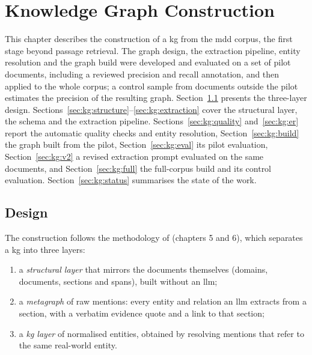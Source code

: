 
\chapter{Knowledge Graph Construction}\label{ch:kg}

This chapter describes the construction of a \gls{kg} from the \gls{mdd} corpus,
the first stage beyond passage retrieval. The graph design, the extraction pipeline,
entity resolution and the graph build were developed and evaluated on a set of pilot
documents, including a reviewed precision and recall annotation, and then applied to
the whole corpus; a control sample from documents outside the pilot estimates the
precision of the resulting graph.
Section~\ref{sec:kg:design} presents the three-layer design.
Sections~\ref{sec:kg:structure}--\ref{sec:kg:extraction} cover the structural
layer, the schema and the extraction pipeline. Sections~\ref{sec:kg:quality}
and~\ref{sec:kg:er} report the automatic quality checks and entity resolution,
Section~\ref{sec:kg:build} the graph built from the pilot,
Section~\ref{sec:kg:eval} its pilot evaluation, Section~\ref{sec:kg:v2} a revised
extraction prompt evaluated on the same documents, and Section~\ref{sec:kg:full} the
full-corpus build and its control evaluation. Section~\ref{sec:kg:status} summarises
the state of the work.


\section{Design}\label{sec:kg:design}

The construction follows the methodology of \textcite{negro2026kg} (chapters 5
and 6), which separates a \gls{kg} into three layers:

\begin{enumerate}
    \item a \emph{structural layer} that mirrors the documents themselves (domains,
          documents, sections and spans), built without an \gls{llm};
    \item a \emph{metagraph} of raw mentions: every entity and relation an
          \gls{llm} extracts from a section, with a verbatim evidence quote and a link
          to that section;
    \item a \emph{\gls{kg} layer} of normalised entities, obtained by resolving
          mentions that refer to the same real-world entity.
\end{enumerate}

